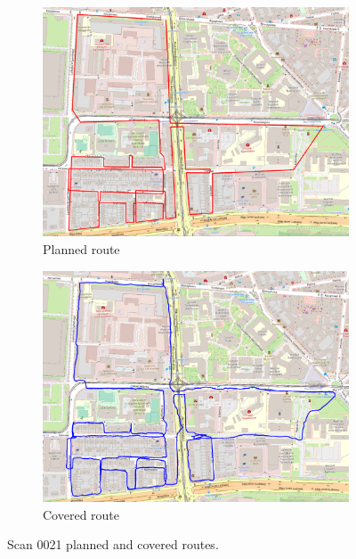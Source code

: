 \documentclass[a4paper,12pt]{book}
\begin{document}
\begin{enumerate}
\begin{figure}[H]
\begin{subfigure}{.90\textwidth}
			\includegraphics[width=1\linewidth]{route_p21}
			\caption{Planned route}
			\label{fig:a21}
		\end{subfigure}%
		\linebreak
		\begin{subfigure}{.90\textwidth}
			\centering
			\includegraphics[width=1\linewidth]{route_c21}
			\caption{Covered route}
			\label{fig:b21}
		\end{subfigure}
		\caption{Scan 0021 planned and covered routes.}
		\label{fig:fig21}
	\end{figure} 
\end{enumerate}
\end{document}
